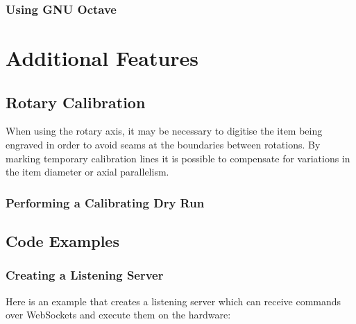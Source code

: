\documentclass[12pt,fleqn]{book} %
\begin{document}
\section{Using GNU Octave}

%

\part{Additional Features}


\chapter{Rotary Calibration}

When using the rotary axis, it may be necessary to digitise the item being engraved in order to avoid seams at the boundaries between rotations. By marking temporary calibration lines it is possible to compensate for variations in the item diameter or axial parallelism.


\section{Performing a Calibrating Dry Run}


%

\chapter{Code Examples}

\section{Creating a Listening Server}

Here is an example that creates a listening server which can receive commands over WebSockets and execute them on the hardware:
\end{document}
